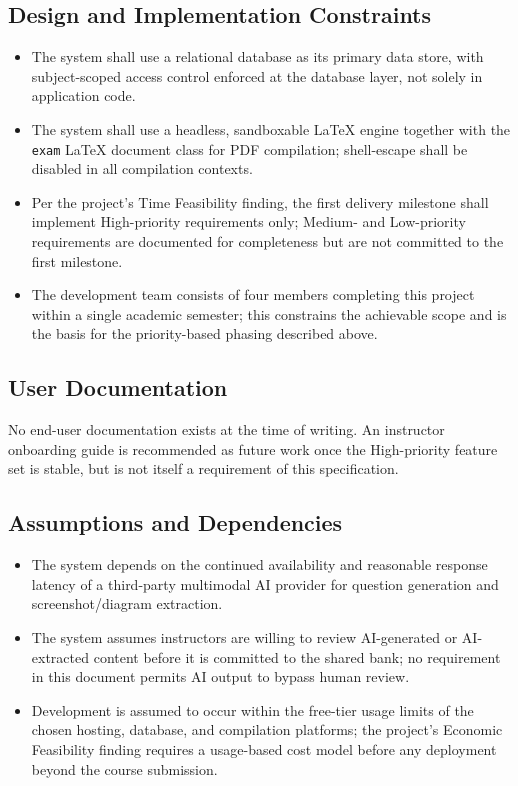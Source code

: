 \documentclass[11pt]{article}
\begin{document}
\subsection{Design and Implementation Constraints}
\begin{itemize}[nosep]
  \item The system shall use a relational database as its primary data
    store, with subject-scoped access control enforced at the database
    layer, not solely in application code.
  \item The system shall use a headless, sandboxable LaTeX engine together
    with the \texttt{exam} LaTeX document class for PDF compilation;
    shell-escape shall be disabled in all compilation contexts.
  \item Per the project's Time Feasibility finding, the first delivery
    milestone shall implement High-priority requirements only; Medium- and
    Low-priority requirements are documented for completeness but are not
    committed to the first milestone.
  \item The development team consists of four members completing this
    project within a single academic semester; this constrains the
    achievable scope and is the basis for the priority-based phasing
    described above.
\end{itemize}

\subsection{User Documentation}
No end-user documentation exists at the time of writing. An instructor
onboarding guide is recommended as future work once the High-priority
feature set is stable, but is not itself a requirement of this
specification.

\subsection{Assumptions and Dependencies}
\begin{itemize}[nosep]
  \item The system depends on the continued availability and reasonable
    response latency of a third-party multimodal AI provider for question
    generation and screenshot/diagram extraction.
  \item The system assumes instructors are willing to review AI-generated
    or AI-extracted content before it is committed to the shared bank; no
    requirement in this document permits AI output to bypass human review.
  \item Development is assumed to occur within the free-tier usage limits
    of the chosen hosting, database, and compilation platforms; the
    project's Economic Feasibility finding requires a usage-based cost
    model before any deployment beyond the course submission.
\end{itemize}
\end{document}
